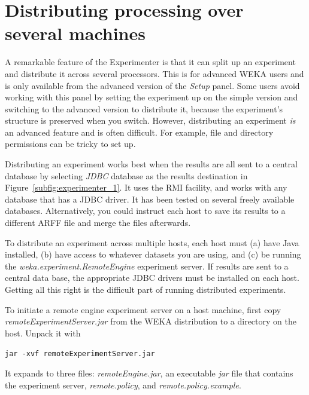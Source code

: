 \section{Distributing processing over several machines}
\label{section:experimenter_distributed}

A remarkable feature of the Experimenter is that it can split up an
experiment and distribute it across several processors. This is for
advanced WEKA users and is only available from the advanced version of
the \textit{Setup} panel. Some users avoid working with this panel by
setting the experiment up on the simple version and switching to the
advanced version to distribute it, because the experiment's structure
is preserved when you switch. However, distributing an experiment
\textit{is} an advanced feature and is often difficult. For example,
file and directory permissions can be tricky to set up.

Distributing an experiment works best when the results are all sent to
a central database by selecting \textit{JDBC} database as the results
destination in Figure~\ref{subfig:experimenter_1}. It uses the RMI
facility, and works with any database that has a JDBC driver. It has
been tested on several freely available databases. Alternatively, you
could instruct each host to save its results to a different ARFF file
and merge the files afterwards.

To distribute an experiment across multiple hosts, each host must (a) have Java installed,
(b) have access to whatever datasets you are using, and (c) be running
the \textit{weka.experiment.RemoteEngine} experiment server. If
results are sent to a central data base, the appropriate JDBC drivers
must be installed on each host. Getting all this right is the
difficult part of running distributed experiments.

To initiate a remote engine experiment server on a host machine, first
copy {\em remoteExperimentServer.jar} from the WEKA distribution to a
directory on the host. Unpack it with\newline

\verb=jar -xvf remoteExperimentServer.jar=\newline

It expands to three files: \textit{remoteEngine.jar}, an executable
\textit{jar} file that contains the experiment server,
\textit{remote.policy}, and \textit{remote.policy.example}.


